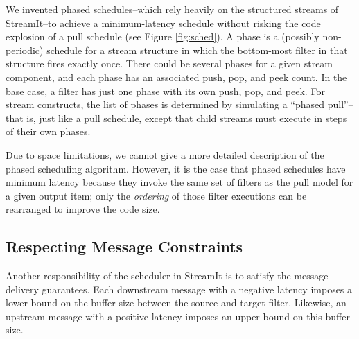 We invented phased schedules--which rely heavily on the structured
streams of StreamIt--to achieve a minimum-latency schedule without
risking the code explosion of a pull schedule (see Figure
\ref{fig:sched}).  A phase is a (possibly non-periodic) schedule for a
stream structure in which the bottom-most filter in that structure
fires exactly once.  There could be several phases for a given stream
component, and each phase has an associated push, pop, and peek count.
In the base case, a filter has just one phase with its own push, pop,
and peek.  For stream constructs, the list of phases is determined by
simulating a ``phased pull''--that is, just like a pull schedule,
except that child streams must execute in steps of their own phases.

Due to space limitations, we cannot give a more detailed description
of the phased scheduling algorithm.  However, it is the case that
phased schedules have minimum latency because they invoke the same set
of filters as the pull model for a given output item; only the {\it
ordering} of those filter executions can be rearranged to improve the
code size.

\vspace{12pt}
\subsection{Respecting Message Constraints}

Another responsibility of the scheduler in StreamIt is to satisfy the
message delivery guarantees.  Each downstream message with a negative
latency imposes a lower bound on the buffer size between the source
and target filter.  Likewise, an upstream message with a positive
latency imposes an upper bound on this buffer size.

